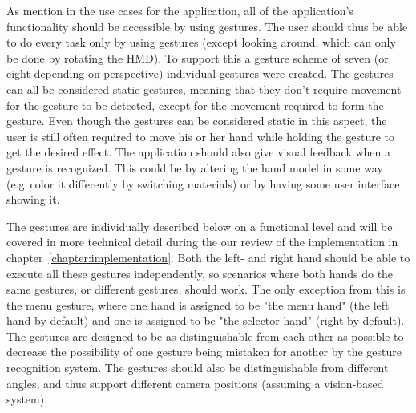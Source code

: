
As mention in the use cases for the application, all of the application's functionality should be accessible by using gestures. The user should thus
be able to do every task only by using gestures (except looking around, which can only be done by rotating the HMD). To support this a gesture scheme of seven (or eight depending
on perspective) individual gestures were created. The gestures can all be considered static gestures, meaning that they don't require movement for the gesture to be detected, 
except for the movement required to form the gesture. 
Even though the gestures can be considered static in this aspect, the user is still often required to move his or her hand while holding the gesture to get the desired effect. 
The application should also give visual feedback when a gesture is recognized. This could be by altering the hand model in some way (e.g~color it differently by
switching materials) or by having some user interface showing it. 


The gestures are individually described below on a functional level and will be covered in more technical detail during the our review of the implementation in chapter~\ref{chapter:implementation}. 
Both the left- and right hand should be able to execute all these gestures independently, so scenarios where both hands do the same gestures, or different gestures, should
work. The only exception from this is the menu gesture, where one hand is assigned to be "the menu hand" (the left hand by default) and one is assigned to be "the selector hand"
(right by default). The gestures are designed to be as distinguishable from each other as possible to decrease the possibility of one gesture being mistaken for another
by the gesture recognition system. The gestures should also be distinguishable from different angles, and thus support different camera positions (assuming a vision-based system).


